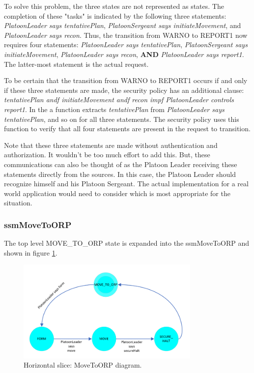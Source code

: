 \documentclass[../../main/main.tex]{subfiles}
\begin{document}
To solve this problem, the three states are not represented as states.  The completion of these "tasks" is indicated by the following three statements: \textit{PlatoonLeader says tentativePlan}, \textit{PlatoonSergeant says initiateMovement}, and \textit{PlatoonLeader says recon}.  Thus, the transition from WARNO to REPORT1 now requires four statements: \textit{PlatoonLeader says tentativePlan}, \textit{PlatoonSergeant says initiateMovement}, \textit{PlatoonLeader says recon}, \textbf{AND} \textit{PlatoonLeader says report1}. The latter-most statement is the actual request.

To be certain that the transition from WARNO to REPORT1 occurs if and only if these three statements are made, the security policy has an additional clause: \textit{tentativePlan andf initiateMovement andf recon impf PlatoonLeader controls report1}.  In the  a function extracts \textit{tentativePlan} from \textit{PlatoonLeader says tentativePlan}, and so on for all three statements. The security policy uses this function to verify that all four statements are present in the request to transition.

Note that these three statements are made without authentication and authorization.  It wouldn't be too much effort to add this.  But, these communications can also be thought of as the Platoon Leader receiving these statements directly from the sources.  In this case, the Platoon Leader should recognize himself and his Platoon Sergeant.  The actual implementation for a real world application would need to consider which is most appropriate for the situation.



\clearpage
\subsubsection{ssmMoveToORP}\label{sssec:ssmMoveToORP}
The top level MOVE_TO_ORP state is expanded into the ssmMoveToORP  and shown in figure \ref{ssmMoveToORPDiagram}.

\begin{figure}[!h]
\centering
\includegraphics[width=0.8\textwidth]{../figures/ssmMoveToORPDiagram}
\caption{\label{ssmMoveToORPDiagram} Horizontal slice: MoveToORP diagram.}
\end{figure}
\end{document}
